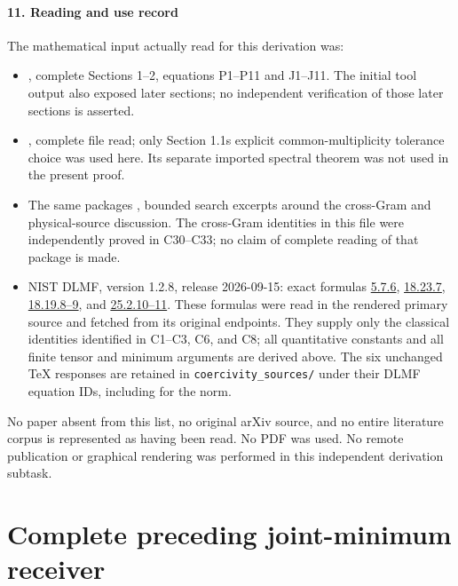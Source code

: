 \documentclass[11pt]{article}
\begin{document}
\subsection{11. Reading and use record}\label{mrcoerc:reading-and-use-record}

The mathematical input actually read for this derivation was:

\begin{itemize}
\mrcoerctightlist
\item
  , complete Sections 1--2, equations P1--P11 and J1--J11. The initial tool output also exposed later sections; no independent verification of those later sections is asserted.
\item
  , complete file read; only Section 1.1\textquotesingle s explicit common-multiplicity tolerance choice was used here. Its separate imported spectral theorem was not used in the present proof.
\item
  The same package\textquotesingle s , bounded search excerpts around the cross-Gram and physical-source discussion. The cross-Gram identities in this file were independently proved in C30--C33; no claim of complete reading of that package is made.
\item
  NIST DLMF, version 1.2.8, release 2026-09-15: exact formulas \href{https://dlmf.nist.gov/5.7.E6}{5.7.6}, \href{https://dlmf.nist.gov/18.23.E7}{18.23.7}, \href{https://dlmf.nist.gov/18.19.E8}{18.19.8--9}, and \href{https://dlmf.nist.gov/25.2.E10}{25.2.10--11}. These formulas were read in the rendered primary source and fetched from its original  endpoints. They supply only the classical identities identified in C1--C3, C6, and C8; all quantitative constants and all finite tensor and minimum arguments are derived above. The six unchanged TeX responses are retained in \texttt{coercivity\_sources/} under their DLMF equation IDs, including  for the norm.
\end{itemize}

No paper absent from this list, no original arXiv source, and no entire literature corpus is represented as having been read. No PDF was used. No remote publication or graphical rendering was performed in this independent derivation subtask.

\endgroup

\clearpage\begingroup
\part*{Complete preceding joint-minimum receiver}
\newcommand{\mrjmC}{\mathbb C}
\end{document}
